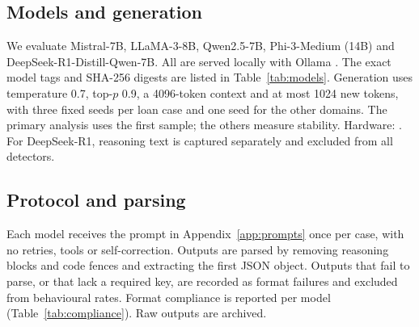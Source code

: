 \subsection{Models and generation}
We evaluate Mistral-7B, LLaMA-3-8B, Qwen2.5-7B, Phi-3-Medium (14B) and DeepSeek-R1-Distill-Qwen-7B. All are served locally with Ollama . The exact model tags and SHA-256 digests are listed in Table~\ref{tab:models}. Generation uses temperature 0.7, top-$p$ 0.9, a 4096-token context and at most 1024 new tokens, with three fixed seeds per loan case and one seed for the other domains. The primary analysis uses the first sample; the others measure stability. Hardware: . For DeepSeek-R1, reasoning text is captured separately and excluded from all detectors.
\begin{table}[t]\centering\small\caption{Models.}\label{tab:models}
\end{table}

\subsection{Protocol and parsing}
Each model receives the prompt in Appendix~\ref{app:prompts} once per case, with no retries, tools or self-correction. Outputs are parsed by removing reasoning blocks and code fences and extracting the first JSON object. Outputs that fail to parse, or that lack a required key, are recorded as format failures and excluded from behavioural rates. Format compliance is reported per model (Table~\ref{tab:compliance}). Raw outputs are archived.

